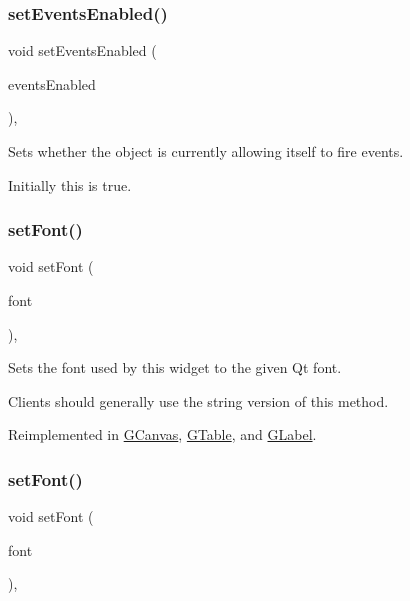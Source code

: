 \subsubsection{\texorpdfstring{set\+Events\+Enabled()}{setEventsEnabled()}}
{\footnotesize\ttfamily void set\+Events\+Enabled (\begin{DoxyParamCaption}\item[{bool}]{events\+Enabled }\end{DoxyParamCaption})\hspace{0.3cm}{\ttfamily [virtual]}, {\ttfamily [inherited]}}



Sets whether the object is currently allowing itself to fire events. 

Initially this is true. \mbox{\label{classGInteractor_a2592348886ffea646c6534bf88f7c49d}} 
\subsubsection{\texorpdfstring{set\+Font()}{setFont()}\hspace{0.1cm}{\footnotesize\ttfamily [1/2]}}
{\footnotesize\ttfamily void set\+Font (\begin{DoxyParamCaption}\item[{const Q\+Font \&}]{font }\end{DoxyParamCaption})\hspace{0.3cm}{\ttfamily [virtual]}, {\ttfamily [inherited]}}



Sets the font used by this widget to the given Qt font. 

Clients should generally use the string version of this method. 

Reimplemented in \mbox{\hyperlink{classGCanvas_ad1d75b3840a41ba7d1e8a921696dc684}{G\+Canvas}}, \mbox{\hyperlink{classGTable_ad1d75b3840a41ba7d1e8a921696dc684}{G\+Table}}, and \mbox{\hyperlink{classGLabel_ad1d75b3840a41ba7d1e8a921696dc684}{G\+Label}}.

\mbox{\label{classGInteractor_a8e096e8818d838aceae1d46d58fb3a7b}} 
\subsubsection{\texorpdfstring{set\+Font()}{setFont()}\hspace{0.1cm}{\footnotesize\ttfamily [2/2]}}
{\footnotesize\ttfamily void set\+Font (\begin{DoxyParamCaption}\item[{const std\+::string \&}]{font }\end{DoxyParamCaption})\hspace{0.3cm}{\ttfamily [virtual]}, {\ttfamily [inherited]}}



